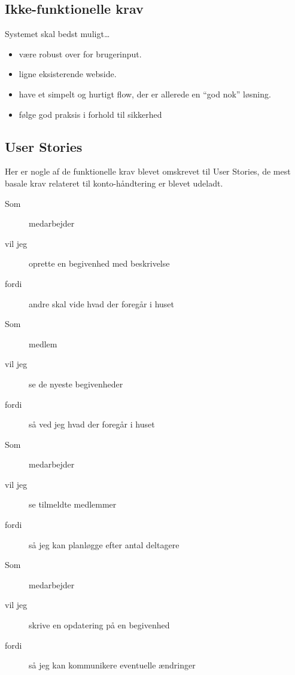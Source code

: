 \documentclass[../main]{subfiles}
\begin{document}
    \subsection{Ikke-funktionelle krav}
        Systemet skal bedst muligt\dots
        \begin{itemize}
            \item være robust over for brugerinput.
            \item ligne eksisterende webside.
            \item have et simpelt og hurtigt flow, der er allerede en \enquote{god nok} løsning.
            \item følge god praksis i forhold til sikkerhed
        \end{itemize}


    \subsection{User Stories}
        Her er nogle af de funktionelle krav blevet omskrevet til User Stories, de mest basale krav relateret til konto-håndtering er blevet udeladt.

        \begin{description}
            \item[Som] medarbejder
            \item[vil jeg] oprette en begivenhed med beskrivelse
            \item[fordi] andre skal vide hvad der foregår i huset
        \end{description}

        \begin{description}
            \item[Som] medlem
            \item[vil jeg] se de nyeste begivenheder
            \item[fordi] så ved jeg hvad der foregår i huset 
        \end{description}

        \begin{description}
            \item[Som] medarbejder
            \item[vil jeg] se tilmeldte medlemmer
            \item[fordi] så jeg kan planløgge efter antal deltagere
        \end{description}

        \begin{description}
            \item[Som] medarbejder
            \item[vil jeg] skrive en opdatering på en begivenhed
            \item[fordi] så jeg kan kommunikere eventuelle ændringer
        \end{description}
\end{document}
